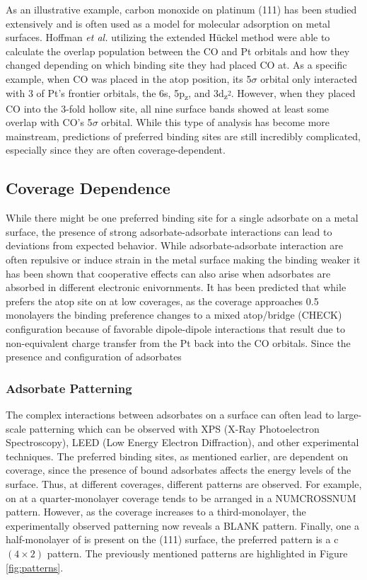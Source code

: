 As an illustrative example, carbon monoxide on platinum (111) has been studied
extensively\citep{Ertl:1977, Kelemen:1979, Yeo:1997, Wong:1991ta, Feibelman:2001, Deshlahra:2009wu,
Deshlahra:2012aa} and is often used as a model for molecular adsorption on
metal surfaces.  Hoffman {\em et al.} utilizing the extended H\"uckel
method\citep{Wong:1991ta} were able to calculate the overlap population between
the CO and Pt orbitals and how they changed depending on which binding site
they had placed CO at. As a specific example, when CO was placed in the atop
position, its 5$\sigma$ orbital only interacted with 3 of Pt's frontier
orbitals, the 6s, 5p\textsubscript{z}, and
3d\textsubscript{z\textsuperscript{2}}. However, when they placed CO into the
3-fold hollow site, all nine surface bands showed at least some overlap with
CO's 5$\sigma$ orbital. While this type of analysis has become more mainstream,
predictions of preferred binding sites are still incredibly complicated,
especially since they are often coverage-dependent.

\subsection{Coverage Dependence}
While there might be one preferred binding site for a single adsorbate on a
metal surface, the presence of strong adsorbate-adsorbate interactions can lead
to deviations from expected behavior. While adsorbate-adsorbate interaction are
often repulsive or induce strain in the metal surface making the binding
weaker\citep{Deshlahra:2012aa} it has been shown that cooperative effects can also arise when
adsorbates are absorbed in different electronic enivornments. It has been
predicted that while  prefers the atop site on  at low coverages,
as the coverage approaches 0.5 monolayers the binding preference changes to a
mixed atop/bridge (CHECK) configuration because of favorable dipole-dipole
interactions that result due to non-equivalent charge transfer from the Pt back
into the CO orbitals. Since the presence and configuration of adsorbates 


\subsubsection{Adsorbate Patterning}
The complex interactions between adsorbates on a surface can often lead to
large-scale patterning which can be observed with XPS (X-Ray Photoelectron
Spectroscopy), LEED (Low Energy Electron Diffraction), and other experimental
techniques. The preferred binding sites, as mentioned earlier, are dependent on
coverage, since the presence of bound adsorbates affects the energy levels of
the surface. Thus, at different coverages, different patterns are observed. For
example,  on  at a quarter-monolayer coverage tends to be
arranged in a NUMCROSSNUM pattern. However, as the coverage increases to a
third-monolayer, the experimentally observed patterning now reveals a BLANK
pattern. Finally, one a half-monolayer of  is present on the (111)
surface, the preferred pattern is a c$(4\times2)$ pattern. The previously
mentioned patterns are highlighted in Figure \ref{fig:patterns}.

